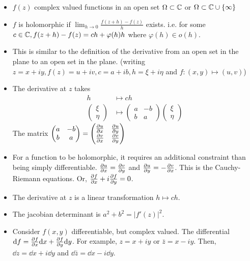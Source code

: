 \documentclass[a4paper,12pt]{article}
\begin{document}
\begin{itemize}
    \item $f(z)$ complex valued functions in an open set $\Omega\subset\mathbb{C}$ or $\Omega\subset\mathbb{C}\cup\{\infty\}$
    \item $f$ is holomorphic if $\lim_{h\to0}\frac{f(z+h)-f(z)}{h}$ exists. i.e. for some $c\in\mathbb{C}, f(z+h)-f(z)=ch+\varphi(h)h$ where $\varphi(h)\in o(h)$.
    \item This is similar to the definition of the derivative from an open set in the plane to an open set in the plane. (writing $z=x+iy,f(z)=u+iv,c=a+ib,h=\xi+i\eta$ and $f:(x,y)\mapsto(u,v)$)
    \item The derivative at $z$ takes\begin{align}
        h&\mapsto ch\\
        \begin{pmatrix}
            \xi\\
            \eta
        \end{pmatrix}&\mapsto\begin{pmatrix}
            a & -b\\
            b & a
        \end{pmatrix}\begin{pmatrix}
            \xi\\
            \eta
        \end{pmatrix}
    \end{align}
    The matrix $\begin{pmatrix}
        a & -b\\
        b & a
    \end{pmatrix}=\begin{pmatrix}
        \partialderivative{u}{x} & \partialderivative{u}{y}\\
        \partialderivative{v}{x} & \partialderivative{v}{y}
    \end{pmatrix}$
    \item For a function to be holomorphic, it requires an additional constraint than being simply differentiable. $\partialderivative{u}{x}=\partialderivative{v}{y}$ and $\partialderivative{u}{y}=-\partialderivative{v}{x}$. This is the Cauchy-Riemann equations. Or, $\partialderivative{f}{x}+i\partialderivative{f}{y}=0$.
    \item The derivative at $z$ is a linear transformation $h\mapsto ch$.
    \item The jacobian determinant is $a^2+b^2=|f'(z)|^2$.
    \item Consider $f(x,y)$ differentiable, but complex valued. The differential $\dd f=\partialderivative{f}{x}\dd x+\partialderivative{f}{y}\dd y$. For example, $z=x+iy$ or $\bar z=x-iy$. Then, $\dd z=\dd x+i\dd y$ and $\dd\bar z=\dd x-i\dd y$.

\end{itemize}
\end{document}
